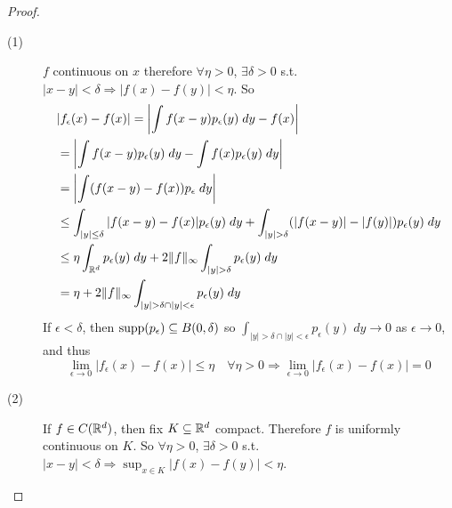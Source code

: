 \begin{proof} \leavevmode
    \begin{description}
        \item[(1)] $f$ continuous on $x$ therefore $\forall \eta > 0$, $\exists \delta > 0$
        s.t. $|x - y| < \delta \Rightarrow |f(x) - f(y)| < \eta$. So 
        \begin{align*}
            &|f_\epsilon(x) - f(x)| = \left| \int f(x-y) p_\epsilon(y) \; dy  - f(x) \right| \\
            &= \left| \int f(x-y) p_\epsilon(y) \; dy - \int f(x) p_\epsilon (y) \; dy \right| \\
            &= \left| \int (f(x-y) - f(x)) p_\epsilon \; dy \right|  \\  
            &\leq \int_{|y| \leq \delta} |f(x-y) - f(x)| p_\epsilon(y) \; dy +
            \int_{|y| > \delta} (|f(x-y)| - |f(y)|) p_\epsilon(y) \; dy \\
            &\leq \eta \int_{\mathbb{R}^d} p_\epsilon(y) \; dy + 2 \| f \|_\infty \int_{|y| > \delta} p_\epsilon(y) \; dy \\
            &= \eta + 2 \| f \|_\infty \int_{|y| > \delta \cap |y| < \epsilon} p_\epsilon(y) \; dy \\
        \end{align*}    
        If $\epsilon < \delta$, then $\operatorname{supp}(p_\epsilon) \subseteq B(0, \delta)$ so
        $\int_{|y| > \delta \cap |y| < \epsilon} p_\epsilon(y) \; dy \to 0$ as $\epsilon \to 0$,
        and thus
        \[
            \lim_{\epsilon \to 0} |f_\epsilon(x) - f(x)| \leq \eta \quad \forall \eta > 0
            \Rightarrow \lim_{\epsilon \to 0} |f_\epsilon(x) - f(x)| = 0
        \] 
        \item[(2)] If $f \in C(\mathbb{R}^d)$, then fix $K \subseteq \mathbb{R}^d $ compact. Therefore
        $f$ is uniformly continuous on $K$. So $\forall \eta > 0$, $\exists \delta > 0$ s.t.
        $|x - y| < \delta \Rightarrow \sup_{x \in K} |f(x) - f(y)| < \eta$.
        

\end{description}
\end{proof}
